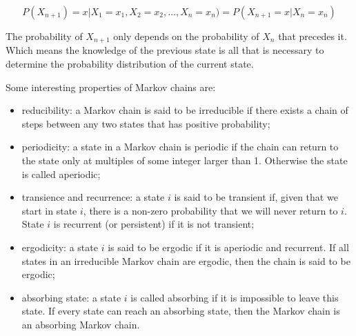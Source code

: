 \begin{equation}
P(X_{n+1}) = x | X_1 = x_1, X_2 = x_2, \ldots, X_n = x_n) = P( X_{n+1} = x | X_n = x_n)
\end{equation}

The probability of $X_{n+1}$ only depends on the probability of $X_n$ that precedes it. Which means the knowledge of the previous state is all that is necessary to determine the probability distribution of the current state.

\begin{attention}
Some interesting properties of Markov chains are:

\begin{itemize}
\tightlist
\item reducibility: a Markov chain is said to be irreducible if there exists a chain of steps between any two states that has positive probability;
\item periodicity: a state in a Markov chain is periodic if the chain can return to the state only at multiples of some integer larger than 1. Otherwise the state is called aperiodic;	
\item transience and recurrence: a state $i$ is said to be transient if, given that we start in state $i$, there is a non-zero probability that we will never return to $i$. State $i$ is recurrent (or persistent) if it is not transient;
\item ergodicity: a state $i$ is said to be ergodic if it is aperiodic and recurrent. If all states in an irreducible Markov chain are ergodic, then the chain is said to be ergodic;
\item absorbing state: a state $i$ is called absorbing if it is impossible to leave this state. If every state can reach an absorbing state, then the Markov chain is an absorbing Markov chain.
\end{itemize}
\end{attention}


